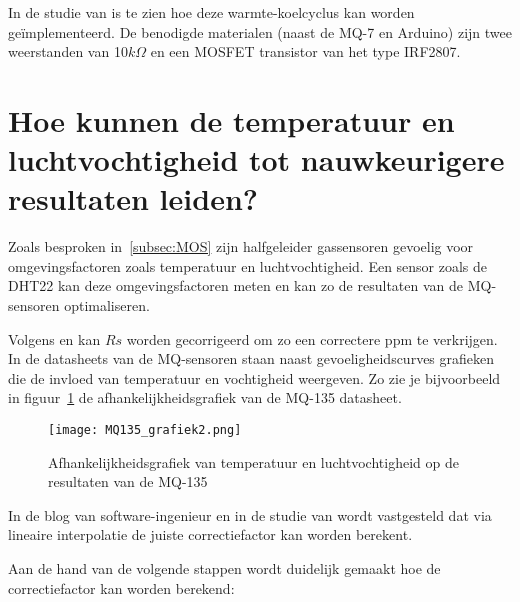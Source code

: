 In de studie van 
is te zien hoe deze warmte-koelcyclus kan worden geïmplementeerd. De benodigde materialen (naast de MQ-7 en Arduino) zijn twee weerstanden van 10$k\Omega$ en een MOSFET transistor van het type IRF2807.


\section{Hoe kunnen de temperatuur en luchtvochtigheid tot nauwkeurigere resultaten leiden?}
\label{sec:temp-en-hum}

Zoals besproken in~\ref{subsec:MOS} zijn halfgeleider gassensoren gevoelig voor omgevingsfactoren zoals temperatuur en luchtvochtigheid. Een sensor zoals de DHT22
kan deze omgevingsfactoren meten en kan zo de resultaten van de MQ-sensoren optimaliseren.

Volgens
en
kan $Rs$ worden gecorrigeerd om zo een correctere ppm te verkrijgen. In de datasheets 
van de MQ-sensoren staan naast gevoeligheidscurves grafieken die de invloed van temperatuur en vochtigheid weergeven. Zo zie je bijvoorbeeld in figuur~\ref{fig:MQ135_grafiek2} de afhankelijkheidsgrafiek van de MQ-135 datasheet.

\begin{figure}[h]
    \texttt{[image: MQ135\_grafiek2.png]}
    \caption[Afhankelijkheid temperatuur en luchtvochtigheid op MQ-135]{Afhankelijkheidsgrafiek van temperatuur en luchtvochtigheid op de resultaten van de MQ-135
    }
    \label{fig:MQ135_grafiek2}
\end{figure}

In de blog van software-ingenieur
en in de studie van
wordt vastgesteld dat via lineaire interpolatie de juiste correctiefactor kan worden berekent.

Aan de hand van de volgende stappen wordt duidelijk gemaakt hoe de correctiefactor kan worden berekend:

